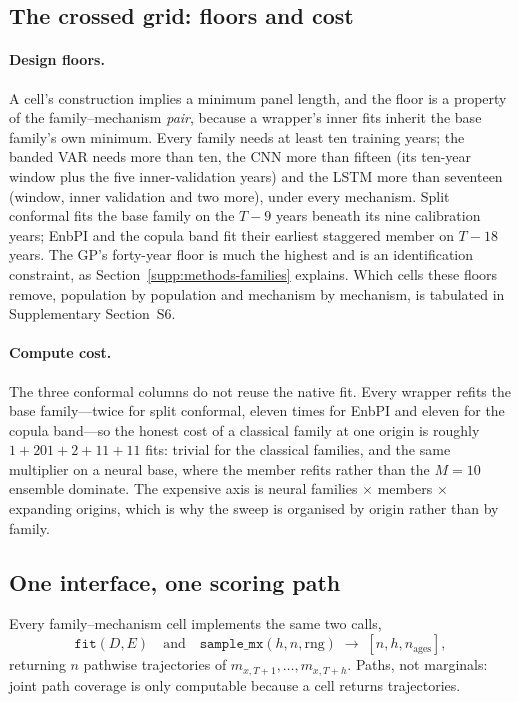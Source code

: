 \subsection{The crossed grid: floors and cost}
\label{supp:methods-grid}

\paragraph{Design floors.} A cell's construction implies a minimum panel
length, and the floor is a property of the family--mechanism \emph{pair},
because a wrapper's inner fits inherit the base family's own minimum. Every
family needs at least ten training years; the banded VAR needs more than ten,
the CNN more than fifteen (its ten-year window plus the five inner-validation
years) and the LSTM more than seventeen (window, inner validation and two
more), under every mechanism. Split conformal fits the base family on the
$T-9$ years beneath its nine calibration years; EnbPI and the copula band fit
their earliest staggered member on $T-18$ years. The GP's forty-year floor is
much the highest and is an identification constraint, as
Section~\ref{supp:methods-families} explains. Which cells these floors remove,
population by population and mechanism by mechanism, is tabulated in
Supplementary Section~S6.

\paragraph{Compute cost.} The three conformal columns do not reuse the native
fit. Every wrapper refits the base family---twice for split conformal, eleven
times for EnbPI and eleven for the copula band---so the honest cost of a
classical family at one origin is roughly $1+201+2+11+11$ fits: trivial for
the classical families, and the same multiplier on a neural base, where the
member refits rather than the $M=10$ ensemble dominate. The expensive axis is
neural families $\times$ members $\times$ expanding origins, which is why the
sweep is organised by origin rather than by family.

\subsection{One interface, one scoring path}
\label{supp:methods-interface}

Every family--mechanism cell implements the same two calls,
\[
  \texttt{fit}(D, E) \quad\text{and}\quad
  \texttt{sample\_mx}(h, n, \text{rng}) \;\to\; [n, h, n_{\text{ages}}],
\]
returning $n$ pathwise trajectories of $m_{x,T+1},\dots,m_{x,T+h}$. Paths, not
marginals: joint path coverage is only computable because a cell returns
trajectories.

